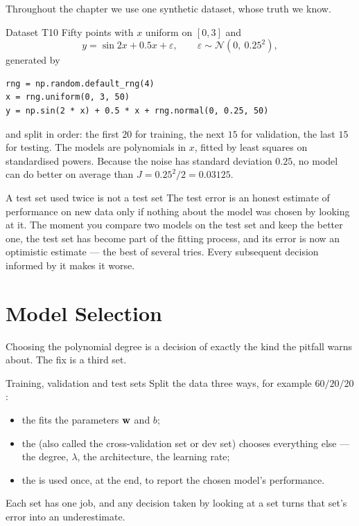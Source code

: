 Throughout the chapter we use one synthetic dataset, whose truth we know.

\begin{defbox}{Dataset T10}
Fifty points with $x$ uniform on $[0, 3]$ and
\[
  y = \sin 2x + 0.5x + \varepsilon, \qquad \varepsilon \sim \mathcal{N}(0,\ 0.25^2),
\]
generated by
\begin{lstlisting}[style=pythonml]
rng = np.random.default_rng(4)
x = rng.uniform(0, 3, 50)
y = np.sin(2 * x) + 0.5 * x + rng.normal(0, 0.25, 50)
\end{lstlisting}
and split in order: the first $20$ for training, the next $15$ for validation,
the last $15$ for testing. The models are polynomials in $x$, fitted by least
squares on standardised powers. Because the noise has standard deviation
$0.25$, no model can do better on average than $J = 0.25^2/2 = 0.03125$.
\end{defbox}

\begin{pitfall}{A test set used twice is not a test set}
The test error is an honest estimate of performance on new data only if nothing
about the model was chosen by looking at it. The moment you compare two models
on the test set and keep the better one, the test set has become part of the
fitting process, and its error is now an optimistic estimate --- the best of
several tries. Every subsequent decision informed by it makes it worse.
\end{pitfall}

\section{Model Selection}
\label{sec:model-selection}

Choosing the polynomial degree is a decision of exactly the kind the pitfall
warns about. The fix is a third set.

\begin{defbox}{Training, validation and test sets}
Split the data three ways, for example $60/20/20$:
\begin{itemize}
  \item the  fits the parameters $\mathbf{w}$ and $b$;
  \item the  (also called the cross-validation set or dev
        set) chooses everything else --- the degree, $\lambda$, the
        architecture, the learning rate;
  \item the  is used once, at the end, to report the chosen
        model's performance.
\end{itemize}
Each set has one job, and any decision taken by looking at a set turns that
set's error into an underestimate.
\end{defbox}

